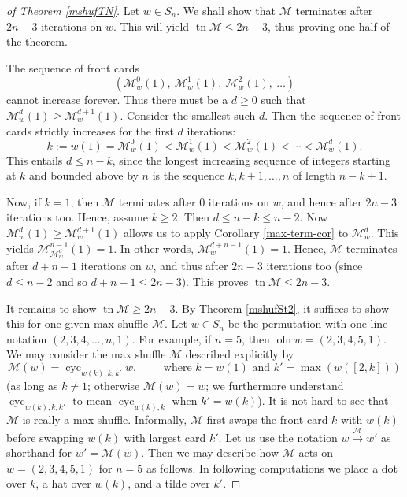 \documentclass[10pt,a4paper]{amsart}
\newcommand{\Mw}{\mathcal{M}_w} %
\newcommand{\M}{\mathcal{M}} %
\newcommand{\cyc}[1]{\operatorname{cyc}_{#1}}
\newcommand{\oln}{\operatorname{oln}}
\newcommand{\tn}{\operatorname{tn }} %
\newcommand{\tup}[1]{\left( #1 \right)}
\begin{document}
\begin{proof}[of Theorem \ref{mshufTN}]
Let $w \in S_n$. We shall show that $\M$ terminates after $2n-3$ iterations on $w$. This will yield $\tn \M \le 2n-3$, thus proving one half of the theorem.

The sequence of front cards
\[
\tup{\Mw^0(1),\ \Mw^1(1),\ \Mw^2(1),\ \dots}
\]
cannot increase forever.
Thus there must be a $d \ge 0$ such that $\Mw^d(1) \ge \Mw^{d+1}(1)$.
Consider the smallest such $d$.
Then the sequence of front cards strictly increases for the first $d$ iterations:
\[
k := w(1) = \Mw^0(1) < \Mw^1(1) < \Mw^2(1) < \cdots < \Mw^d(1).
\]
This entails $d \le n-k$, since the longest increasing sequence of integers starting at $k$ and bounded above by $n$ is the sequence $k,k+1,\dots,n$ of length $n-k+1$. 

Now, if $k=1$, then $\M$ terminates after $0$ iterations on $w$, and hence after $2n-3$ iterations too.
Hence, assume $k \ge 2$. Then $d \le n-k \le n-2$. Now $\Mw^d(1) \ge \Mw^{d+1}(1)$ allows us to apply Corollary \ref{max-term-cor} to $\Mw^d$. This yields $\M^{n-1}_{\M^d_w}\tup{1} = 1$. In other words, $\Mw^{d+n-1}\tup{1} = 1$.
Hence, $\M$ terminates after $d+n-1$ iterations on $w$, and thus after $2n-3$ iterations too (since $d \le n-2$ and so $d+n-1 \le 2n-3$).
This proves $\tn \M \le 2n-3$.

It remains to show $\tn \M \ge 2n-3$.
By Theorem \ref{mshufSt2}, it suffices to show this for one given max shuffle $\M$.
Let $w \in S_n$ be the permutation with one-line notation $(2,3,4,\dots,n,1)$. For example, if $n=5$, then $\oln w = (2,3,4,5,1)$.
We may consider the max shuffle $\M$ described explicitly by
\[
\M\tup{w} = \cyc{w\tup{k},k,k'} w, \qquad \text{ where } k = w\tup{1} \text{ and } k' = \max\tup{w\tup{[2,k]}}
\]
(as long as $k \neq 1$; otherwise $\M\tup{w} = w$; we furthermore understand $\cyc{w\tup{k},k,k'}$ to mean $\cyc{w\tup{k},k}$ when $k' = w\tup{k}$).
It is not hard to see that $\M$ is really a max shuffle.
Informally, $\M$ first swaps the front card $k$ with $w(k)$ before swapping $w(k)$ with largest card $k'$.
Let us use the notation $w \overset{\M}{ \mapsto } w'$ as shorthand for $w' = \M(w)$.
Then we may describe how $\M$ acts on $w=\tup{2,3,4,5,1}$ for $n = 5$ as follows. In following computations we place a dot over $k$, a hat over $w(k)$, and a tilde over $k'$.


\end{proof}
\end{document}
